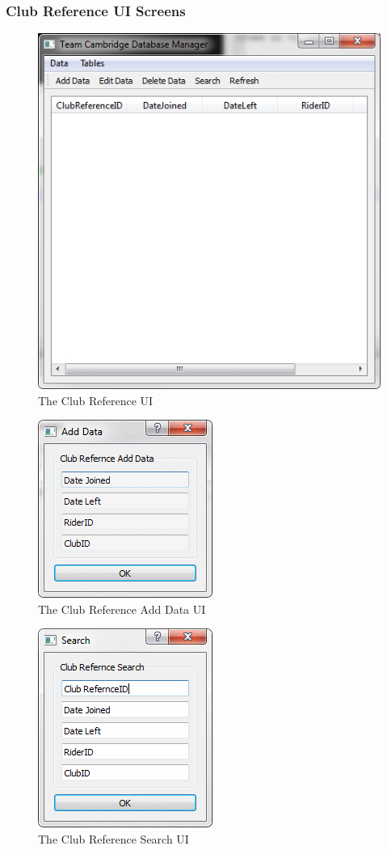 \subsubsection{Club Reference UI Screens}

\begin{figure}[H]
\includegraphics{./Maintenance/UI/ClubRef.png}
\caption{The Club Reference UI} \label{fig:ClubRef_UI}
\end{figure}

\begin{figure}[H]
\includegraphics{./Maintenance/UI/ClubRefAD.png}
\caption{The Club Reference Add Data UI} \label{fig:ClubRefAD_UI}
\end{figure}

\begin{figure}[H]
\includegraphics{./Maintenance/UI/ClubRefSearch.png}
\caption{The Club Reference Search UI} \label{fig:ClubRefSearch_UI}
\end{figure}


